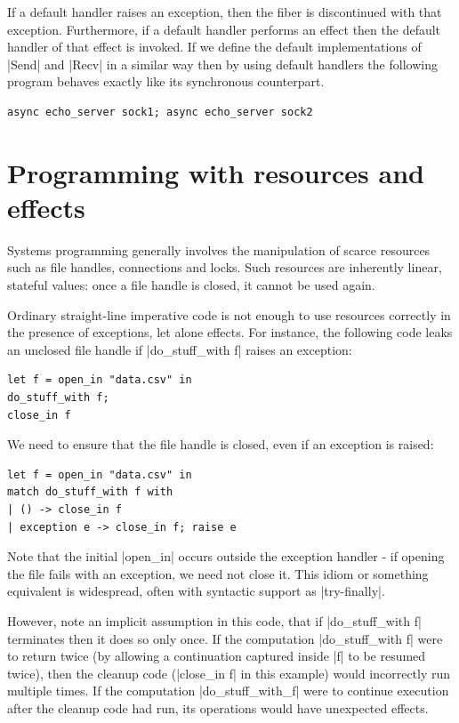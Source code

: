 \documentclass{llncs}
\begin{document}
If a default handler raises an exception, then the fiber is discontinued with
that exception. Furthermore, if a default handler performs an effect then the
default handler of that effect is invoked.
If we define the default implementations of |Send| and |Recv| in a
similar way then by using default handlers the following program
behaves exactly like its synchronous counterpart.
\begin{lstlisting}
async echo_server sock1; async echo_server sock2
\end{lstlisting}

\section{Programming with resources and effects}
\label{sec:async_effects}

Systems programming generally involves the manipulation of scarce
resources such as file handles, connections and locks. Such resources
are inherently linear, stateful values: once a file handle is closed,
it cannot be used again.

Ordinary straight-line imperative code is not enough to use resources
correctly in the presence of exceptions, let alone effects.
For instance, the following code leaks an unclosed file handle if
|do_stuff_with f| raises an exception:
\begin{lstlisting}
let f = open_in "data.csv" in
do_stuff_with f;
close_in f
\end{lstlisting}
We need to ensure that the file handle is closed, even if an
exception is raised:
\begin{lstlisting}
let f = open_in "data.csv" in
match do_stuff_with f with
| () -> close_in f
| exception e -> close_in f; raise e
\end{lstlisting}
Note that the initial |open_in| occurs outside the exception handler -
if opening the file fails with an exception, we need not close
it. This idiom or something equivalent is widespread, often with
syntactic support as |try-finally|.

However, note an implicit assumption in this code, that if |do_stuff_with f|
terminates then it does so only once. If the computation |do_stuff_with f| were
to return twice (by allowing a continuation captured inside |f| to be
resumed twice), then the cleanup code (|close_in f| in this example) would
incorrectly run multiple times. If the computation |do_stuff_with_f| were to
continue execution after the cleanup code had run, its operations would have
unexpected effects.
\end{document}
